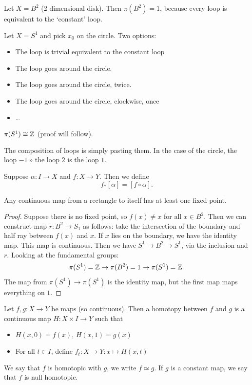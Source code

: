 \begin{eg}
    Let $X = B^2$ (2 dimensional disk).
    Then $\pi(B^2) = 1$, because every loop is equivalent to the `constant' loop.
\end{eg}
\begin{eg}
    Let $X = S^{1}$ and pick $x_0$ on the circle.
    Two options: 
    \begin{itemize}
        \item The loop is trivial equivalent to the constant loop
        \item The loop goes around the circle.
        \item The loop goes around the circle, twice.
        \item The loop goes around the circle, clockwise, once
        \item \ldots
    \end{itemize}
    $\pi(S^{1}) \cong \mathbb{Z}$ (proof will follow).
\end{eg}

The composition of loops is simply pasting them.
In the case of the circle, the loop $-1$  $\circ$ the loop  $2$ is the loop $1$.

Suppose $\alpha: I \to  X$ and $f : X\to Y$. Then we define 
\[
    f_*[\alpha] = [f \circ \alpha]
.\] 


\begin{theorem}
    Any continuous map from a rectangle to itself has at least one fixed point.
\end{theorem}
\begin{proof}
    Suppose there is no fixed point, so $f(x) \neq x$ for all  $x \in B^2$.
    Then we can construct map $r : B^2 \to  S_1$ as follows:
    take the intersection of the boundary and half ray between $f(x)$ and $x$.
    If $x$ lies on the boundary, we have the identity map.
    This map is continuous.
    Then we have $S^1 \to B^2 \to S^1$, via the inclusion and $r$.
    Looking at the fundamental groups:
    \[
        \pi(S^1)  =\mathbb{Z} \to  \pi(B^2) = 1 \to  \pi(S^1) = \mathbb{Z}
    .\] 
    The map from $\pi(S^1) \to  \pi(S^{1})$ is the identity map, but the first map maps everything on $1$. 
\end{proof}

\setcounter{section}{50}
\begin{definition}[Homotopy]
    Let $f,g:X\to Y$ be maps (so continuous). Then a homotopy between $f$ and $g$ is a continuous map $H: X\times I \to Y$ such that
    \begin{itemize}
        \item $H(x, 0) = f(x)$, $H(x, 1) = g(x)$ 
        \item For all $t \in I$, define $f_t: X \to  Y: x \mapsto  H(x, t)$
    \end{itemize}
    We say that $f$ is homotopic with $g$, we write $f \simeq g$.
    If $g$ is a constant map, we say that $f$ is null homotopic.
\end{definition}

